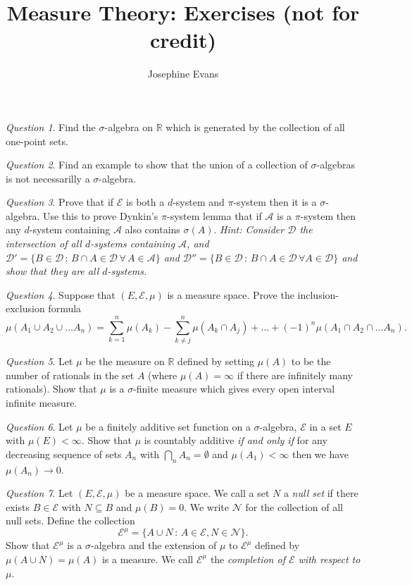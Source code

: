 \documentclass[11pt]{article}
\author{
Josephine Evans
}
\title{Measure Theory: Exercises (not for credit)}
\theoremstyle{definition}
\theoremstyle{remark}
\newtheorem{q}{Question}
\begin{document}
\maketitle

\begin{q}
Find the $\sigma$-algebra on $\mathbb{R}$ which is generated by the collection of all one-point sets.
\end{q}

\begin{q}
Find an example to show that the union of a collection of $\sigma$-algebras is not necessarilly a $\sigma$-algebra.
\end{q}

\begin{q}
Prove that if $\mathcal{E}$ is both a $d$-system and $\pi$-system then it is a $\sigma$-algebra. Use this to prove Dynkin's $\pi$-system lemma that if $\mathcal{A}$ is a $\pi$-system then any $d$-system containing $\mathcal{A}$ also contains $\sigma(A)$. \emph{Hint: Consider $\mathcal{D}$ the intersection of all $d$-systems containing $\mathcal{A}$, and $\mathcal{D}' = \{B \in \mathcal{D}\,:\, B \cap A \in \mathcal{D} \, \forall \, A \in \mathcal{A}\}$ and $\mathcal{D}'' = \{ B \in \mathcal{D} \, :\, B \cap A \in \mathcal{D} \, \forall A \in \mathcal{D}\}$ and show that they are all $d$-systems.}
\end{q}

\begin{q}
Suppose that $(E, \mathcal{E}, \mu)$ is a measure space. Prove the inclusion-exclusion formula
\[ \mu(A_1 \cup A_2 \cup \dots A_n) = \sum_{k=1}^n \mu(A_k)- \sum_{k \neq j}^n \mu(A_k \cap A_j) + \dots + (-1)^n \mu(A_1 \cap A_2 \cap \dots A_n). \]
\end{q}

\begin{q}
Let $\mu$ be the measure on $\mathbb{R}$ defined by setting $\mu(A)$ to be the number of rationals in the set $A$ (where $\mu(A) = \infty$ if there are infinitely many rationals). Show that $\mu$ is a $\sigma$-finite measure which gives every open interval infinite measure. 
\end{q}

\begin{q}
Let $\mu$ be a finitely additive set function on a $\sigma$-algebra, $\mathcal{E}$ in a set $E$ with $\mu(E) < \infty$. Show that $\mu$ is countably additive \emph{if and only if} for any decreasing sequence of sets $A_n$ with $\bigcap_n A_n = \emptyset$ and $\mu(A_1) < \infty$ then we have $\mu(A_n) \rightarrow 0$.
\end{q}

\begin{q}
Let $(E, \mathcal{E}, \mu)$ be a measure space. We call a set $N$ a \emph{null set} if there exists $B \in \mathcal{E}$ with $N \subseteq B$ and $\mu(B) = 0$. We write $\mathcal{N}$ for the collection of all null sets. Define the collection
\[ \mathcal{E}^\mu = \{ A \cup N \, :\, A \in \mathcal{E}, N \in \mathcal{N}\}. \] Show that $\mathcal{E}^\mu$ is a $\sigma$-algebra and the extension of $\mu$ to $\mathcal{E}^\mu$ defined by $\mu(A \cup N) = \mu(A)$ is a measure. We call $\mathcal{E}^\mu$ the \emph{completion of $\mathcal{E}$ with respect to $\mu$}.
\end{q}
\end{document}
